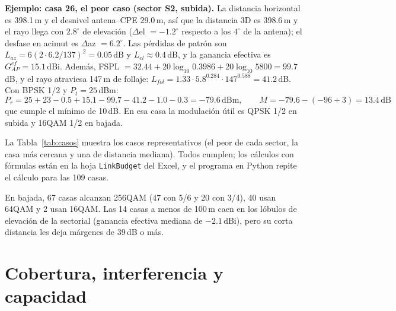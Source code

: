 \documentclass[11pt,a4paper]{article}
\begin{document}
\textbf{Ejemplo: casa 26, el peor caso (sector S2, subida).} La distancia horizontal es 398.1\,m y el desnivel antena--CPE 29.0\,m, así que la distancia 3D es 398.6\,m y el rayo llega con $2.8^\circ$ de elevación ($\Delta$el $=-1.2^\circ$ respecto a los $4^\circ$ de la antena); el desfase en acimut es $\Delta$az $=6.2^\circ$. Las pérdidas de patrón son $L_{az}=6(2\cdot6.2/137)^2=0.05$\,dB y $L_{el}\approx0.4$\,dB, y la ganancia efectiva es $G_{AP}^{ef}=15.1$\,dBi. Además, FSPL $=32.44+20\log_{10}0.3986+20\log_{10}5800=99.7$\,dB, y el rayo atraviesa 147\,m de follaje: $L_{fol}=1.33\cdot5.8^{0.284}\cdot147^{0.588}=41.2$\,dB. Con BPSK 1/2 y $P_t=25$\,dBm:
\[P_r=25+23-0.5+15.1-99.7-41.2-1.0-0.3=-79.6\,\mathrm{dBm},\qquad M=-79.6-(-96+3)=13.4\,\mathrm{dB}\]
que cumple el mínimo de 10\,dB. En esa casa la modulación útil es QPSK 1/2 en subida y 16QAM 1/2 en bajada.

La Tabla~\ref{tab:casos} muestra los casos representativos (el peor de cada sector, la casa más cercana y una de distancia mediana). Todos cumplen; los cálculos con fórmulas están en la hoja \texttt{LinkBudget} del Excel, y el programa en Python repite el cálculo para las 109 casas.
\begin{table}[H]\centering\caption{Casos representativos del presupuesto de enlace (DL = bajada, UL = subida; ganancia, FSPL y follaje en dB).}\label{tab:casos}\small\resizebox{\textwidth}{!}{}\end{table}
En bajada, 67 casas alcanzan 256QAM (47 con 5/6 y 20 con 3/4), 40 usan 64QAM y 2 usan 16QAM. Las 14 casas a menos de 100\,m caen en los lóbulos de elevación de la sectorial (ganancia efectiva mediana de $-2.1$\,dBi), pero su corta distancia les deja márgenes de 39\,dB o más.

\section{Cobertura, interferencia y capacidad}\label{sec:interf}
\end{document}

